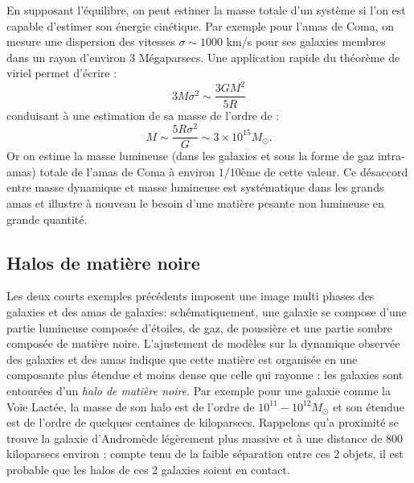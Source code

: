 En supposant l'équilibre, on peut estimer la masse totale d'un système si l'on est capable d'estimer son énergie cinétique. Par exemple pour l'amas de Coma, on mesure une dispersion des vitesses $\sigma \sim 1000$ km/s pour ses galaxies membres dans un rayon d'environ 3 Mégaparsecs. Une application rapide du théorème de viriel permet d'écrire  :
\begin{equation}
3M\sigma^2\sim \frac{3GM^2}{5R}
\end{equation}
conduisant à une estimation de sa masse de l'ordre de :
\begin{equation}
M\sim\frac{5R\sigma^2}{G}\sim 3\times 10^{15} M_\odot.
\end{equation}
Or on estime la masse lumineuse (dans les galaxies et sous la forme de gaz intra-amas) totale de l'amas de Coma à environ $1/10$ème de cette valeur. Ce désaccord entre masse dynamique et masse lumineuse est systématique dans les grands amas et illustre à nouveau le besoin d'une matière pesante non lumineuse en grande quantité.

\subsection{Halos de matière noire}

Les deux courts exemples précédents imposent une image multi phases des galaxies et des amas de galaxies: schématiquement, une galaxie se compose d'une partie lumineuse composée d'étoiles, de gaz, de poussière et une partie sombre composée de matière noire. L'ajustement de modèles sur la dynamique observée des galaxies et des amas indique que cette matière est organisée en une composante plus étendue et moins dense que celle qui rayonne : les galaxies sont entourées d'un \textit{halo de matière noire}. Par exemple pour une galaxie comme la Voie Lactée, la masse de son halo est de l'ordre de $10^{11}-10^{12} M_\odot$ et son étendue est de l'ordre de quelques centaines de kiloparsecs. Rappelons qu'a proximité se trouve la galaxie d'Andromède légèrement plus massive et à une distance de 800 kiloparsecs environ : compte tenu de la faible séparation entre ces 2 objets, il est probable que les halos de ces 2 galaxies soient en contact.

